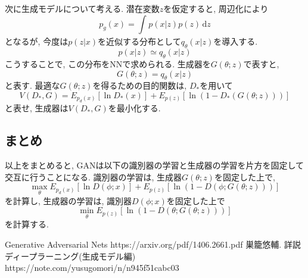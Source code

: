 \documentclass[twocolumn]{jarticle}
\begin{document}
次に生成モデルについて考える. 潜在変数${z}$を仮定すると, 周辺化により
\begin{equation}
  p_g(x) = \int_{}^{} p(x|z)p(z)\,\mathrm{d}z
\end{equation}
となるが, 今度は${p(z|x)}$を近似する分布として${q_\theta(x|z)}$を導入する.
\begin{equation}
  p(x|z) \simeq q_\theta(x|z)
\end{equation}
こうすることで, この分布をNNで求められる. 生成器を${G(\theta;z)}$で表すと,
\begin{equation}
  G(\theta;z) = q_\theta(x|z)
\end{equation}
と表す. 最適な${G(\theta;z)}$を得るための目的関数は, ${D_\ast}$を用いて
\begin{equation}
  V(D_\ast, G) = E_{p_d(x)}[\ln D_\ast(x)] + E_{p(z)}[\ln(1 - D_\ast(G(\theta; z)))]
\end{equation}
と表せ, 生成器は${V(D_\ast, G)}$を最小化する.

\subsection{まとめ}
以上をまとめると, GANは以下の識別器の学習と生成器の学習を片方を固定して交互に行うことになる. 識別器の学習は, 生成器${G(\theta;z)}$を固定した上で,
\begin{equation}
  \max_\theta E_{p_d(x)}[\ln D(\phi; x)] + E_{p(z)}[\ln (1 - D(\phi; G(\theta; z)))]
\end{equation}
を計算し, 生成器の学習は, 識別器${D(\phi;x)}$を固定した上で
\begin{equation}
  \min_\theta E_{p(z)} [\ln (1 - D(\theta; G(\theta; z)))]
\end{equation}
を計算する.


\begin{thebibliography}{9}
   Generative Adversarial Nets https://arxiv.org/pdf/1406.2661.pdf
   巣籠悠輔. 詳説ディープラーニング(生成モデル編)　https://note.com/yusugomori/n/n945f51cabc03
\end{thebibliography}
\end{document}

